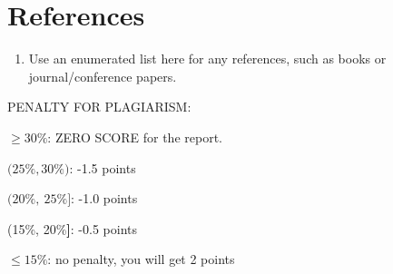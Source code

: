 \section{References}\label{references}

\begin{enumerate}
\def\labelenumi{\arabic{enumi}.}
\item
  Use an enumerated list here for any references, such as books or
  journal/conference papers.
\end{enumerate}

PENALTY FOR PLAGIARISM:

\(\geq 30\%\): ZERO SCORE for the report.

\((25\%,30\%\mathbf{)}\): -1.5 points

\((20\%,\ 25\%\mathbf{\rbrack}\): -1.0 points

(15\%, 20\%\textbf{{]}}: -0.5 points

\(\leq 15\%\): no penalty, you will get 2 points
